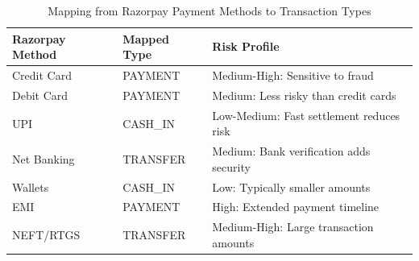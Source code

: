 \begin{table}[!htb]
\centering
\small
\begin{tabular}{|p{3.8cm}|p{3.8cm}|p{6.0cm}|}
\hline
\cellcolor{lightblue!30}\textbf{Razorpay Method} & \cellcolor{lightblue!30}\textbf{Mapped Type} & \cellcolor{lightblue!30}\textbf{Risk Profile} \\
\hline
Credit Card & PAYMENT & Medium-High: Sensitive to fraud \\
\hline
Debit Card & PAYMENT & Medium: Less risky than credit cards \\
\hline
UPI & CASH\_IN & Low-Medium: Fast settlement reduces risk \\
\hline
Net Banking & TRANSFER & Medium: Bank verification adds security \\
\hline
Wallets & CASH\_IN & Low: Typically smaller amounts \\
\hline
EMI & PAYMENT & High: Extended payment timeline \\
\hline
NEFT/RTGS & TRANSFER & Medium-High: Large transaction amounts \\
\hline
\end{tabular}
\caption{Mapping from Razorpay Payment Methods to Transaction Types}
\label{table:razorpay_mapping}
\end{table}